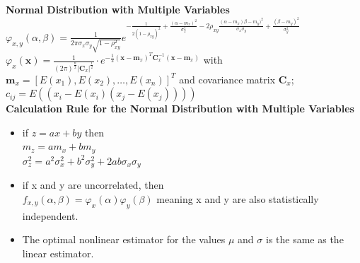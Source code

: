         \textbf{ Normal Distribution with Multiple Variables}\\
        $\varphi_{x,y}(\alpha,\beta)=\frac{1}{2\pi \sigma_x \sigma_y \sqrt{1-\rho_{xy}^2}}
            e^{-\frac{1}{2(1-\rho_{xy})^2} + \frac{(\alpha - m_x)^2}{\sigma_x^2} 
            - 2\rho_{xy}\frac{(\alpha - m_x)\beta - m_y)^2}{\sigma_x \sigma_y} + \frac{(\beta - m_y)^2}{\sigma_y^2}}$\\
            $\varphi_x(\textbf{x})=\frac{1}{(2\pi)^{\frac{n}{2}}|\textbf{C}_x|^{\frac{1}{2}}}\cdot 
            e^{-\frac{1}{2}(\textbf{x} - \textbf{m}_x)^T \textbf{C}_x^{-1} (\textbf{x} - \textbf{m}_x)}$ with \\
            $\textbf{m}_x=[E(x_1), E(x_2), \ldots, E(x_n)]^T$ and covariance matrix $\textbf{C}_x$; $c_{ij} = E((x_i-E(x_i)(x_j-E(x_j))))$ \\
        \textbf{Calculation Rule for the Normal Distribution with Multiple Variables}
        \begin{itemize}
          \item if $z=a x + b y$ then \\
          $m_z =  a m_x + b m_y$\\
          $\sigma_z^2 = a^2\sigma_x^2 + b^2\sigma_y^2+2ab\sigma_x\sigma_y$
          \item if x and y are uncorrelated, then \\
                $f_{x,y}(\alpha, \beta) = \varphi_x(\alpha)\varphi_y(\beta)$ meaning x and y are also statistically independent.
          \item The optimal nonlinear estimator for the values $\mu$ and $\sigma$ is the same as the linear estimator.
        \end{itemize}


